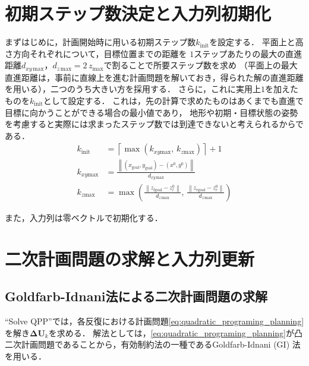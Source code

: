 \documentclass[autodetect-engine,dvipdfmx-if-dvi,ja=standard,a4j,jbase=11pt,magstyle=nomag*]{bxjsreport}
\begin{document}
\section{初期ステップ数決定と入力列初期化}
まずはじめに，計画開始時に用いる初期ステップ数$k_\mathrm{init}$を設定する．
平面上と高さ方向それぞれについて，目標位置までの距離を
$1$ステップあたりの最大の直進距離$d_{xy\,\mathrm{max}}$，$d_{z\,\mathrm{max}} = 2 \, z_\mathrm{max}$で割ることで所要ステップ数を求め
（平面上の最大直進距離は，事前に直線上を進む計画問題を解いておき，得られた解の直進距離を用いる），二つのうち大きい方を採用する．
さらに，これに実用上$1$を加えたものを$k_\mathrm{init}$として設定する．
これは，先の計算で求めたものはあくまでも直進で目標に向かうことができる場合の最小値であり，
地形や初期・目標状態の姿勢を考慮すると実際には求まったステップ数では到達できないと考えられるからである．
\begin{equation}
    \begin{aligned}
        k_\mathrm{init} & = \left\lceil \max \left( k_{xy \mathrm{max}} ,\, k_{z \mathrm{max}} \right) \right\rceil + 1 \\
        k_{xy \mathrm{max}} & = \frac{\left\| \left( x_\mathrm{goal}, y_\mathrm{goal} \right) - \left( x^0 , y^0 \right) \right\|}{d_{xy\,\mathrm{max}}} \\
        k_{z \mathrm{max}} & =\max \left( \frac{\left\| z_{l \mathrm{goal}} - z_l^0 \right\|}{d_{z\,\mathrm{max}}} ,\, \frac{\left\| z_{r \mathrm{goal}} - z_r^0 \right\|}{d_{z\,\mathrm{max}}} \right)
    \end{aligned}
\end{equation}

また，入力列は零ベクトルで初期化する．

\section{二次計画問題の求解と入力列更新}
\label{sec:solve_qpp}
\subsection{Goldfarb-Idnani法による二次計画問題の求解}
``Solve QPP''では，各反復における計画問題\cref{eq:quadratic_programing_planning}を解き$\bm{\Delta U}_k$を求める．
解法としては，\cref{eq:quadratic_programing_planning}が凸二次計画問題であることから，有効制約法の一種であるGoldfarb-Idnani (GI) 法\cite{goldfarb_1983mp}を用いる．
\end{document}
